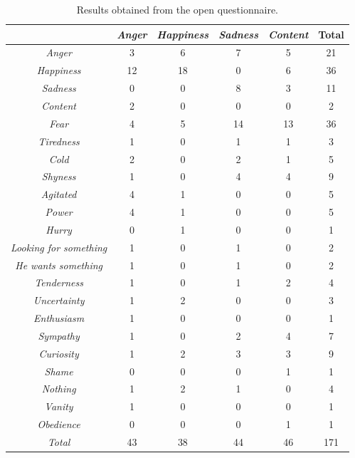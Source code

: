 \begin{table}[h]
\centering
		\caption{Results obtained from the open questionnaire.}
		\label{table:open_questionnaire}
		\small
			\begin{tabular}{|c|c|c|c|c|c|}
				\hline
					\backslashbox{Presented}{Reported}&\textit{Anger}&\textit{Happiness}&\textit{Sadness}&\textit{Content}&Total\\
				\hline
					\textit{Anger}& 3&6&7&5&21\\
				\hline
					\textit{Happiness}&12& 18&0&6&36\\
				\hline
					\textit{Sadness}&0&0& 8&3&11\\
				\hline
					\textit{Content}&2&0&0& 0&2\\
				\hline
					\textit{Fear}&4&5&14&13&36\\
				\hline
					\textit{Tiredness}&1&0&1&1&3\\
				\hline
					\textit{Cold}&2&0&2&1&5\\
				\hline
					\textit{Shyness}&1&0&4&4&9\\
				\hline
					\textit{Agitated}&4&1&0&0&5\\
				\hline
					\textit{Power}&4&1&0&0&5\\
				\hline
					\textit{Hurry}&0&1&0&0&1\\
				\hline
					\textit{Looking for something}&1&0&1&0&2\\
				\hline
					\textit{He wants something}&1&0&1&0&2\\
				\hline
					\textit{Tenderness}&1&0&1&2&4\\
				\hline
					\textit{Uncertainty}&1&2&0&0&3\\
				\hline
					\textit{Enthusiasm}&1&0&0&0&1\\
				\hline
					\textit{Sympathy}&1&0&2&4&7\\
				\hline
					\textit{Curiosity}&1&2&3&3&9\\
				\hline
					\textit{Shame}&0&0&0&1&1\\
				\hline
					\textit{Nothing}&1&2&1&0&4\\
				\hline
					\textit{Vanity}&1&0&0&0&1\\
				\hline
					\textit{Obedience}&0&0&0&1&1\\
				\hline
					\textit{Total}&43&38&44&46&171\\
				\hline
			\end{tabular}
\end{table}

